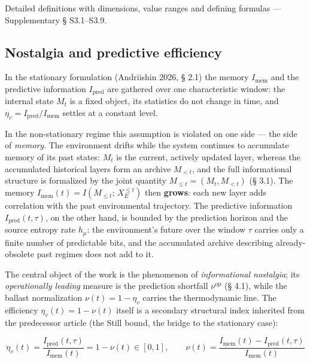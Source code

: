 \documentclass[pdflatex,sn-mathphys-ay]{sn-jnl}
\providecommand{\lt}{<}\providecommand{\gt}{>}
\begin{document}
Detailed definitions with dimensions, value ranges and defining formulas --- Supplementary § S3.1--S3.9.



\subsection{Nostalgia and predictive efficiency}\label{nostalgia-and-predictive-efficiency}



In the stationary formulation (Andriishin 2026, § 2.1) the memory \(I_{\text{mem}}\) and the predictive information \(I_{\text{pred}}\) are gathered over one characteristic window: the internal state \(M_t\) is a fixed object, its statistics do not change in time, and \(\eta_v = I_{\text{pred}}/I_{\text{mem}}\) settles at a constant level.



In the non-stationary regime this assumption is violated on one side --- the side of \emph{memory}. The environment drifts while the system continues to accumulate memory of its past states: \(M_t\) is the current, actively updated layer, whereas the accumulated historical layers form an archive \(M_{\lt t}\), and the full informational structure is formalized by the joint quantity \(M_{\le t} = (M_t, M_{\lt t})\) (§ 3.1). The memory \(I_{\text{mem}}(t) = I(M_{\le t};\, X_E^{\le t})\) then \textbf{grows}: each new layer adds correlation with the past environmental trajectory. The predictive information \(I_{\text{pred}}(t,\tau)\), on the other hand, is bounded by the prediction horizon and the source entropy rate \(h_\mu\): the environment's future over the window \(\tau\) carries only a finite number of predictable bits, and the accumulated archive describing already-obsolete past regimes does not add to it.



The central object of the work is the phenomenon of \emph{informational nostalgia}; its \emph{operationally leading} measure is the prediction shortfall \(\nu^{\text{op}}\) (§ 4.1), while the ballast normalization \(\nu(t) = 1 - \eta_v\) carries the thermodynamic line. The efficiency \(\eta_v(t) = 1 - \nu(t)\) itself is a secondary structural index inherited from the predecessor article (the Still bound, the bridge to the stationary case):



\[\eta_v(t) = \frac{I_{\text{pred}}(t,\tau)}{I_{\text{mem}}(t)} = 1 - \nu(t) \in [0,1], \qquad \nu(t) = \frac{I_{\text{mem}}(t) - I_{\text{pred}}(t,\tau)}{I_{\text{mem}}(t)}\]
\end{document}
